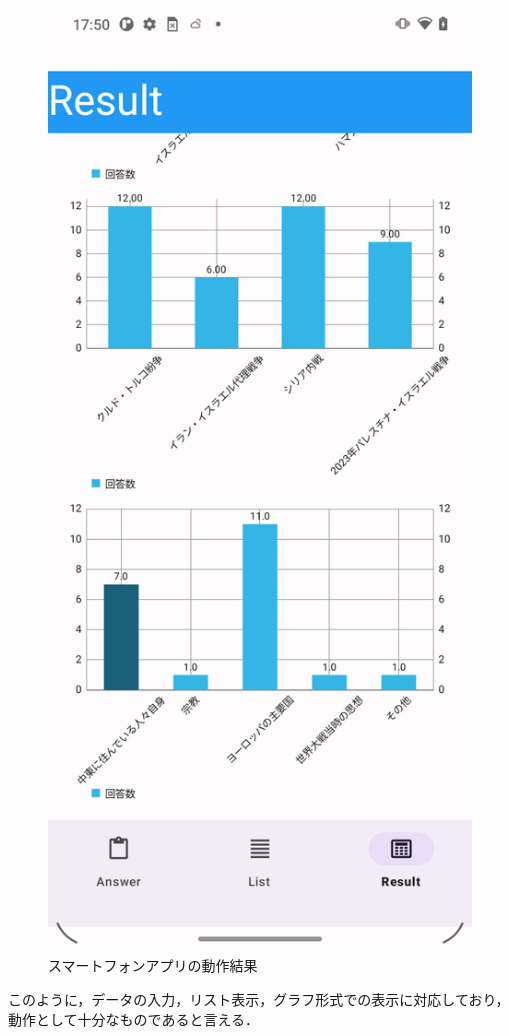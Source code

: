 \documentclass[titlepage,a4paper]{jsarticle}
\begin{document}
\begin{figure}[H]
\begin{minipage}[t]{0.3\textwidth}
  \end{minipage}
  \hfill
  \begin{minipage}[t]{0.3\textwidth}
    \centering
    \includegraphics[height=0.4\textheight]{img/move/app5.png}
  \end{minipage}
  \caption{スマートフォンアプリの動作結果}
  \label{appfig}
\end{figure}
このように，データの入力，リスト表示，グラフ形式での表示に対応しており，動作として十分なものであると言える．
\end{document}
